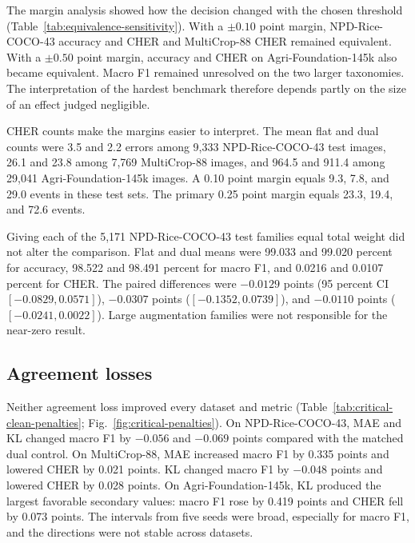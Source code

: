 \documentclass[preprint,12pt]{elsarticle}
\begin{document}
The margin analysis showed how the decision changed with the chosen threshold
(Table~\ref{tab:equivalence-sensitivity}). With a $\pm0.10$ point margin,
NPD-Rice-COCO-43 accuracy and CHER and MultiCrop-88 CHER remained equivalent.
With a $\pm0.50$ point margin, accuracy and CHER on Agri-Foundation-145k also
became equivalent. Macro F1 remained unresolved on the two larger taxonomies.
The interpretation of the hardest benchmark therefore depends partly on the
size of an effect judged negligible.



CHER counts make the margins easier to interpret. The mean flat and dual counts
were 3.5 and 2.2 errors among 9,333 NPD-Rice-COCO-43 test images, 26.1 and 23.8
among 7,769 MultiCrop-88 images, and 964.5 and 911.4 among 29,041
Agri-Foundation-145k images. A 0.10 point margin equals 9.3, 7.8, and 29.0 events
in these test sets. The primary 0.25 point margin equals 23.3, 19.4, and 72.6
events.

Giving each of the 5,171 NPD-Rice-COCO-43 test families equal total weight did
not alter the comparison. Flat and dual means were 99.033 and 99.020 percent for
accuracy, 98.522 and 98.491 percent for macro F1, and 0.0216 and 0.0107 percent
for CHER. The paired differences were $-0.0129$ points (95 percent CI
$[-0.0829,0.0571]$), $-0.0307$ points ($[-0.1352,0.0739]$), and $-0.0110$
points ($[-0.0241,0.0022]$). Large augmentation families were not responsible
for the near-zero result.

\subsection{Agreement losses}
\label{sec:penalties}

Neither agreement loss improved every dataset and metric
(Table~\ref{tab:critical-clean-penalties}; Fig.~\ref{fig:critical-penalties}).
On NPD-Rice-COCO-43, MAE and KL changed macro F1 by $-0.056$ and $-0.069$ points
compared with the matched dual control. On MultiCrop-88, MAE increased macro F1
by 0.335 points and lowered CHER by 0.021 points. KL changed macro F1 by
$-0.048$ points and lowered CHER by 0.028 points. On Agri-Foundation-145k, KL
produced the largest favorable secondary values: macro F1 rose by 0.419 points
and CHER fell by 0.073 points. The intervals from five seeds were broad,
especially for macro F1, and the directions were not stable across datasets.


\end{document}
